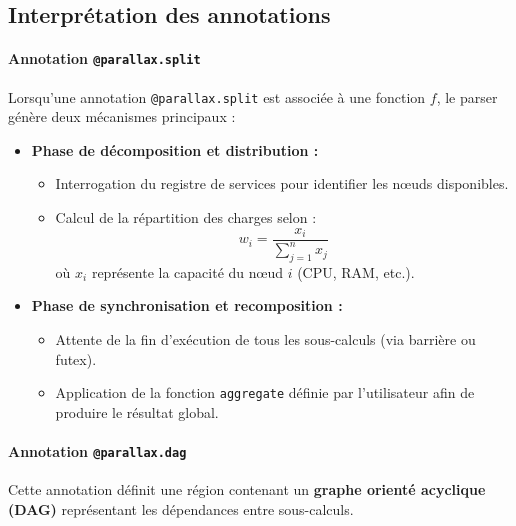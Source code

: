 \documentclass[12pt,a4paper]{report}
\theoremstyle{definition}
\begin{document}

\subsection{Interprétation des annotations}

\paragraph{Annotation \texttt{@parallax.split}}

Lorsqu'une annotation \texttt{@parallax.split} est associée à une fonction \( f \), le parser génère deux mécanismes principaux :

\begin{itemize}
    \item [*]\textbf{Phase de décomposition et distribution :}
    \begin{itemize}
        \item[$\bullet$] Interrogation du registre de services pour identifier les nœuds disponibles.
        \item [$\bullet$]Calcul de la répartition des charges selon :
        \[
        w_i = \frac{x_i}{\sum_{j=1}^{n} x_j}
        \]
        où \( x_i \) représente la capacité du nœud \( i \) (CPU, RAM, etc.).
    \end{itemize}

    \item[*]\textbf{Phase de synchronisation et recomposition :}
    \begin{itemize}
        \item[$\bullet$] Attente de la fin d'exécution de tous les sous-calculs (via barrière ou futex).
        \item [$\bullet$]Application de la fonction \texttt{aggregate} définie par l'utilisateur afin de produire le résultat global.
    \end{itemize}
\end{itemize}


\paragraph{Annotation \texttt{@parallax.dag}}

Cette annotation définit une région contenant un \textbf{graphe orienté acyclique (DAG)} représentant les dépendances entre sous-calculs.
\end{document}
